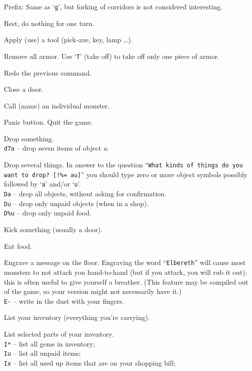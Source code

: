 Prefix:  Same as `{\tt g}', but forking of corridors is not considered
interesting.
\item[\tb{.}]
Rest, do nothing for one turn.
\item[\tb{a}]
Apply (use) a tool (pick-axe, key, lamp \ldots).
\item[\tb{A}]
Remove all armor.  Use `{\tt T}' (take off) to take off only one piece of
armor.
\item[\tb{\^{}A}]
Redo the previous command.
\item[\tb{c}]
Close a door.
\item[\tb{C}]
Call (name) an individual monster.
\item[\tb{\^{}C}]
Panic button.  Quit the game.
\item[\tb{d}]
Drop something.\\
{\tt d7a} -- drop seven items of object
{\it a}.
\item[\tb{D}]
Drop several things.  In answer to the question
``{\tt What kinds of things do you want to drop? [!\%= au]}''
you should type zero or more object symbols possibly followed by
`{\tt a}' and/or `{\tt u}'.\\
{\tt Da}  -- drop all objects, without asking for confirmation.\\
{\tt Du}  -- drop only unpaid objects (when in a shop).\\
{\tt D\%u} -- drop only unpaid food.
\item[\tb{\^{}D}]
Kick something (usually a door).
\item[\tb{e}]
Eat food.
\item[\tb{E}]
Engrave a message on the floor.
Engraving the word ``{\tt Elbereth}'' will cause most monsters to not attack
you hand-to-hand (but if you attack, you will rub it out); this is
often useful to give yourself a breather.  (This feature may be compiled out
of the game, so your version might not necessarily have it.)\\
{\tt E-} -- write in the dust with your fingers.
\item[\tb{i}]
List your inventory (everything you're carrying).
\item[\tb{I}]
List selected parts of your inventory.\\
{\tt I*} -- list all gems in inventory;\\
{\tt Iu} -- list all unpaid items;\\
{\tt Ix} -- list all used up items that are on your shopping bill;\\
